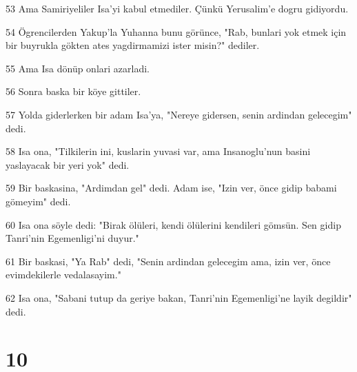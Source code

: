 \par 53 Ama Samiriyeliler Isa'yi kabul etmediler. Çünkü Yerusalim'e dogru gidiyordu.
\par 54 Ögrencilerden Yakup'la Yuhanna bunu görünce, "Rab, bunlari yok etmek için bir buyrukla gökten ates yagdirmamizi ister misin?" dediler.
\par 55 Ama Isa dönüp onlari azarladi.
\par 56 Sonra baska bir köye gittiler.
\par 57 Yolda giderlerken bir adam Isa'ya, "Nereye gidersen, senin ardindan gelecegim" dedi.
\par 58 Isa ona, "Tilkilerin ini, kuslarin yuvasi var, ama Insanoglu'nun basini yaslayacak bir yeri yok" dedi.
\par 59 Bir baskasina, "Ardimdan gel" dedi. Adam ise, "Izin ver, önce gidip babami gömeyim" dedi.
\par 60 Isa ona söyle dedi: "Birak ölüleri, kendi ölülerini kendileri gömsün. Sen gidip Tanri'nin Egemenligi'ni duyur."
\par 61 Bir baskasi, "Ya Rab" dedi, "Senin ardindan gelecegim ama, izin ver, önce evimdekilerle vedalasayim."
\par 62 Isa ona, "Sabani tutup da geriye bakan, Tanri'nin Egemenligi'ne layik degildir" dedi.

\chapter{10}


